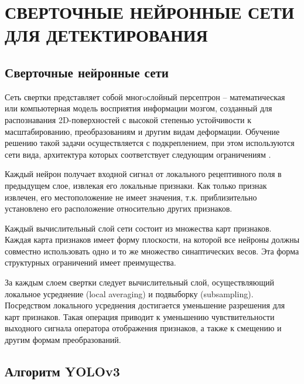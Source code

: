 \chapter{СВЕРТОЧНЫЕ НЕЙРОННЫЕ СЕТИ ДЛЯ ДЕТЕКТИРОВАНИЯ}

\section{Сверточные нейронные сети}


Сеть свертки представляет собой многoслойный персептрон -- математическая или компьютерная модель восприятия информации мозгом, созданный для распознавания 2D-поверхностей с высокой степенью устойчивости к масштабированию, преобразованиям и другим видам деформации. Обучение решению такой задачи осуществляется с подкреплением, при этом используются сети вида, архитектура которых соответствует следующим ограничениям .

Каждый нейрон получает входной сигнал от локального рецептивного поля в предыдущем слое, извлекая его локальные признаки. Как только признак извлечен, его местоположение не имеет значения, т.к. приблизительно установлено его расположение относительно других признаков.

Каждый вычислительный слой сети состоит из множества карт признаков. Каждая карта признаков имеет форму плоскости, на которой все нейроны должны совместно использовать одно и то же множество синаптических весов. Эта форма структурных ограничений имеет преимущества.

За каждым слоем свертки следует вычислительный слой, осуществляющий локальное усреднение (local averaging) и подвыборку (subsampling). Посредством локального усреднения достигается уменьшение разрешения для карт признаков. Такая операция приводит к уменьшению чувствительности выходного сигнала оператора отображения признаков, а также к смещению и другим формам преобразований.


\section{Алгоритм YOLOv3}

